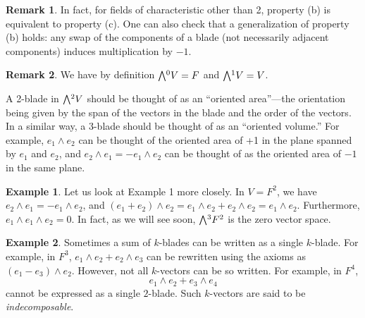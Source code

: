\documentclass[11pt,oneside]{amsart}
\theoremstyle{definition}
\newtheorem{remark}{Remark}
\newtheorem{example}{Example}
\theoremstyle{plain}
\newcommand{\extp}{\mathchoice{{\textstyle\bigwedge}}%
    {{\bigwedge}}%
    {{\textstyle\wedge}}%
    {{\scriptstyle\wedge}}}
\begin{document}
\begin{remark}
    In fact, for fields of characteristic other than 2, property (b) is equivalent to property (c). One can also check that a generalization of property (b) holds: any swap of the components of a blade (not necessarily adjacent components) induces multiplication by $-1$.
\end{remark}
\begin{remark}
    We have by definition $\extp^0 V=F$ and $\extp^1 V=V$.
    
    A 2-blade in $\extp^2 V$ should be thought of as an ``oriented area''---the orientation being given by the span of the vectors in the blade and the order of the vectors. In a similar way, a 3-blade should be thought of as an ``oriented volume.'' For example, $e_1\wedge e_2$ can be thought of the oriented area of +1 in the plane spanned by $e_1$ and $e_2$, and $e_2\wedge e_1=-e_1\wedge e_2$ can be thought of as the oriented area of $-1$ in the same plane.
\end{remark}
\begin{example}
    Let us look at Example 1 more closely. In $V=F^2$, we have $e_2\wedge e_1=-e_1\wedge e_2$, and $(e_1+e_2)\wedge e_2=e_1\wedge e_2+e_2\wedge e_2=e_1\wedge e_2$. Furthermore, $e_1\wedge e_1\wedge e_2=0$. In fact, as we will see soon, $\extp^3 F^2$ is the zero vector space.
\end{example}
\begin{example}
    Sometimes a sum of $k$-blades can be written as a single $k$-blade. For example, in $F^3$, $e_1\wedge e_2+e_2\wedge e_3$ can be rewritten using the axioms as $(e_1-e_3)\wedge e_2$. However, not all $k$-vectors can be so written. For example, in $F^4$,
    \[e_1\wedge e_2+e_3\wedge e_4\]
    cannot be expressed as a single $2$-blade. Such $k$-vectors are said to be \emph{indecomposable}.
\end{example}
\end{document}

